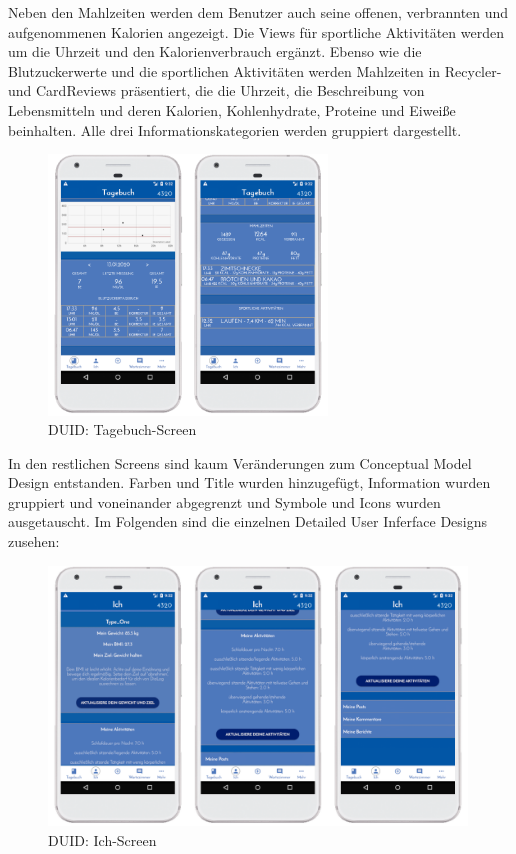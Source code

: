 	Neben den Mahlzeiten werden dem Benutzer auch seine offenen, verbrannten und aufgenommenen Kalorien angezeigt. Die Views für sportliche Aktivitäten werden um die Uhrzeit und den Kalorienverbrauch ergänzt.\newline
	Ebenso wie die Blutzuckerwerte und die sportlichen Aktivitäten werden Mahlzeiten in Recycler- und CardReviews präsentiert, die die Uhrzeit, die Beschreibung von Lebensmitteln und deren Kalorien, Kohlenhydrate, Proteine und Eiweiße beinhalten. Alle drei Informationskategorien werden gruppiert dargestellt.

\begin{figure}[H]
	\centering
	\includegraphics[width=0.66\textwidth]{images/tagebuchscreen_digital.png}
	\captionsetup{justification=centering}
	\caption{DUID: Tagebuch-Screen}
	\label{img:DUIDtagebuchscreen}
\end{figure}
In den restlichen Screens sind kaum Veränderungen zum Conceptual Model Design entstanden. Farben und Title wurden hinzugefügt, Information wurden gruppiert und voneinander abgegrenzt und Symbole und Icons wurden ausgetauscht. Im Folgenden sind die einzelnen Detailed User Inferface Designs zusehen:\\
\begin{figure}[H]
	\centering
	\includegraphics[width=0.99\textwidth]{images/ichscreen_digital.png}
	\captionsetup{justification=centering}
	\caption{DUID: Ich-Screen}
	\label{img:DUIDichscreen}
\end{figure}
